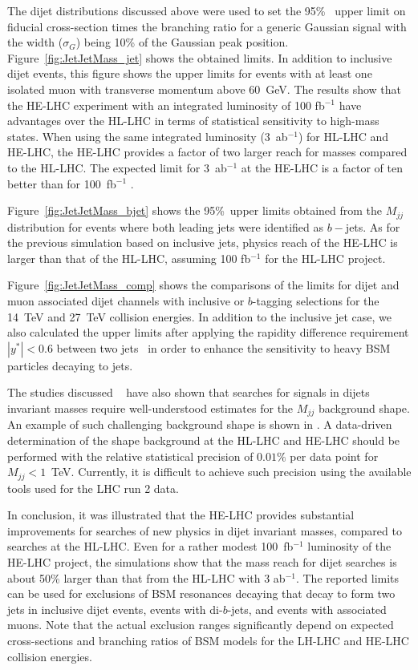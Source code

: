 The dijet distributions discussed above were used to set  the 95\%~\cl 
upper limit on fiducial cross-section times the 
branching ratio for a generic Gaussian signal with
the width ($\sigma_G$) being  10\% of the Gaussian peak position.
Figure~\ref{fig:JetJetMass_jet} shows the  obtained limits.    
In addition to inclusive dijet events, this figure shows the upper limits
for events with at least one isolated muon with transverse momentum above 60~GeV.
The results show that  the HE-LHC experiment with an integrated luminosity of 100 fb$^{-1}$ have advantages
over the HL-LHC in terms of statistical sensitivity to high-mass states. 
When using the same integrated luminosity (3~ab$^{-1}$) for HL-LHC and HE-LHC, 
the HE-LHC provides a factor of two 
larger reach for masses compared to the HL-LHC. The expected limit for 3~ab$^{-1}$ at the HE-LHC 
is a factor of ten better than for 100~fb$^{-1}$ .

Figure~\ref{fig:JetJetMass_bjet} shows the 95\%~\cl upper limits obtained from the $M_{jj}$ distribution for events where both leading jets were identified as $b-$jets.
As for the previous simulation based on inclusive jets, physics reach of the HE-LHC is larger than that of the HL-LHC, assuming 100 fb$^{-1}$ for the HL-LHC project.

Figure~\ref{fig:JetJetMass_comp} shows the comparisons of the limits for dijet and muon associated dijet channels with inclusive  or $b$-tagging selections for the 14~TeV and 27~TeV collision energies. 
In addition to the inclusive jet case, we also calculated the upper limits after applying the rapidity difference requirement $|y^*|<0.6$ between two  jets~\cite{ATLAS:2015nsi}  in order to enhance the sensitivity to heavy
BSM particles decaying to jets.

The studies discussed ~\cite{Chekanov:2017pnx} have also shown that searches for signals in dijets invariant masses require well-understood estimates for the $M_{jj}$ background shape. 
An example of such challenging background shape is shown in .
A data-driven determination of the shape background at the HL-LHC and  HE-LHC
should be performed with the relative statistical precision
of  $0.01\%$ per data point for $M_{jj}<1$~TeV. 
Currently, it is difficult to achieve 
such precision using the available tools used for the LHC run 2 data.

In conclusion, it was illustrated
that the HE-LHC provides substantial improvements for searches of new physics in dijet invariant masses,  compared to searches  at the HL-LHC.
Even for a rather modest 100~fb$^{-1}$ luminosity of the HE-LHC project, the simulations show that the 
mass reach for dijet searches is about 50\% larger than that from the HL-LHC with 3 ab$^{-1}$.
The reported limits can be used for exclusions of BSM resonances decaying that
decay to form two jets in inclusive dijet events, events with di-$b$-jets, and events with associated muons. Note that the actual exclusion ranges significantly depend on expected  cross-sections and branching ratios of BSM models for the LH-LHC and HE-LHC collision energies.

